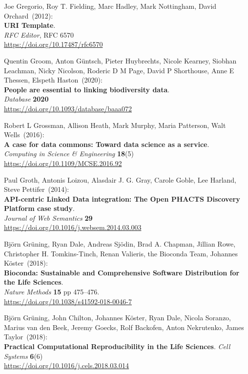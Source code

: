 \begin{thebibliography}{9}
Joe Gregorio, Roy T. Fielding, Marc Hadley, Mark Nottingham, David Orchard~(2012): \\
\textbf{{URI Template}}.\\
\emph{RFC Editor}, RFC 6570 \\
\url{https://doi.org/10.17487/rfc6570}

Quentin Groom, Anton Güntsch, Pieter Huybrechts, Nicole Kearney, Siobhan Leachman, Nicky Nicolson, Roderic D M Page, David P Shorthouse, Anne E Thessen, Elspeth Haston~(2020): \\
\textbf{People are essential to linking biodiversity data}.\\
\emph{Database} \textbf{2020}\\
\url{https://doi.org/10.1093/database/baaa072}

Robert L Grossman, Allison Heath, Mark Murphy, Maria Patterson, Walt Wells~(2016): \\
\textbf{A case for data commons: Toward data science as a service}.\\
\emph{Computing in Science \& Engineering} \textbf{18}(5) \\
\url{https://doi.org/10.1109/MCSE.2016.92}

Paul Groth, Antonis Loizou, Alasdair J. G. Gray, Carole Goble, Lee Harland, Steve Pettifer~(2014): \\
\textbf{API-centric Linked Data integration: {The Open PHACTS Discovery Platform} case study}.\\
\emph{Journal of Web Semantics} \textbf{29} \\
\url{https://doi.org/10.1016/j.websem.2014.03.003}

Björn Grüning, Ryan Dale, Andreas Sjödin, Brad A. Chapman, Jillian Rowe, Christopher H. Tomkins-Tinch, Renan Valieris, the Bioconda Team, Johannes Köster~(2018): \\
\textbf{Bioconda: Sustainable and Comprehensive Software Distribution for the Life Sciences}.\\
\emph{Nature Methods} \textbf{15} pp 475--476.\\
\url{https://doi.org/10.1038/s41592-018-0046-7}

Björn Grüning, John Chilton, Johannes Köster, Ryan Dale, Nicola Soranzo, Marius van den Beek, Jeremy Goecks, Rolf Backofen, Anton Nekrutenko, James Taylor~(2018): \\
\textbf{Practical Computational Reproducibility in the Life Sciences}.
\emph{Cell Systems} \textbf{6}(6)\\
\url{https://doi.org/10.1016/j.cels.2018.03.014}


\end{thebibliography}

